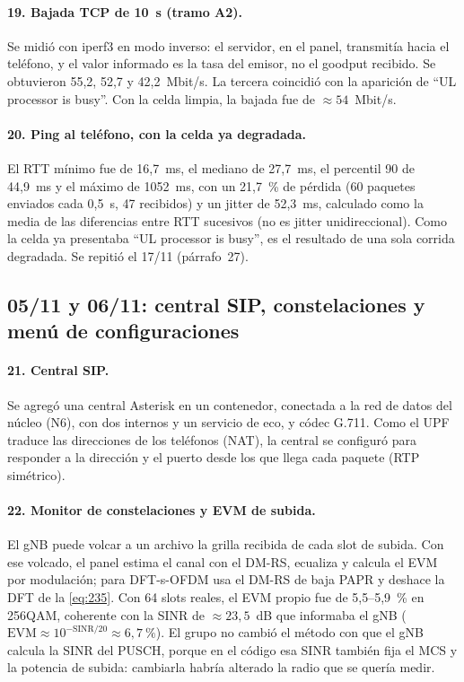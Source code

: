 \paragraph{19. Bajada TCP de 10~s (tramo A2).} Se midió con iperf3 en modo inverso: el servidor, en el panel, transmitía hacia el teléfono, y el valor informado es la tasa del emisor, no el goodput recibido. Se obtuvieron 55,2, 52,7 y 42,2~Mbit/s. La tercera coincidió con la aparición de ``UL processor is busy''. Con la celda limpia, la bajada fue de $\approx 54$~Mbit/s.

\paragraph{20. Ping al teléfono, con la celda ya degradada.} El RTT mínimo fue de 16,7~ms, el mediano de 27,7~ms, el percentil 90 de 44,9~ms y el máximo de 1052~ms, con un 21,7~\% de pérdida (60 paquetes enviados cada 0,5~s, 47 recibidos) y un jitter de 52,3~ms, calculado como la media de las diferencias entre RTT sucesivos (no es jitter unidireccional). Como la celda ya presentaba ``UL processor is busy'', es el resultado de una sola corrida degradada. Se repitió el 17/11 (párrafo~27).

\subsection{05/11 y 06/11: central SIP, constelaciones y menú de configuraciones}
\paragraph{21. Central SIP.} Se agregó una central Asterisk en un contenedor, conectada a la red de datos del núcleo (N6), con dos internos y un servicio de eco, y códec G.711. Como el UPF traduce las direcciones de los teléfonos (NAT), la central se configuró para responder a la dirección y el puerto desde los que llega cada paquete (RTP simétrico).

\paragraph{22. Monitor de constelaciones y EVM de subida.} El gNB puede volcar a un archivo la grilla recibida de cada slot de subida. Con ese volcado, el panel estima el canal con el DM-RS, ecualiza y calcula el EVM por modulación; para DFT-s-OFDM usa el DM-RS de baja PAPR y deshace la DFT de la \cref{eq:235}. Con 64 slots reales, el EVM propio fue de 5,5--5,9~\% en 256QAM, coherente con la SINR de $\approx 23{,}5$~dB que informaba el gNB ($\mathrm{EVM}\approx 10^{-\mathrm{SINR}/20}\approx 6{,}7~\%$). El grupo no cambió el método con que el gNB calcula la SINR del PUSCH, porque en el código esa SINR también fija el MCS y la potencia de subida: cambiarla habría alterado la radio que se quería medir.

